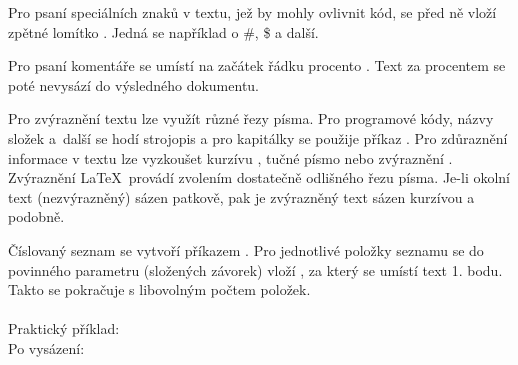 \documentclass[a4paper, 12pt]{report}
\begin{document}
	Pro psaní speciálních znaků v textu, jež by mohly ovlivnit kód, se před ně vloží zpětné lomítko \kurziva{$\backslash$}. Jedná se například o \#, \$ a další. 
	
	Pro psaní komentáře se umístí na začátek řádku procento \kurziva{\%}. Text za procentem se poté nevysází do výsledného dokumentu.
	
	Pro zvýraznění textu lze využít různé řezy písma. Pro programové kódy, názvy složek a~další se hodí strojopis  a pro kapitálky se použije příkaz . Pro zdůraznění informace v textu lze vyzkoušet kurzívu , tučné písmo  nebo zvýraznění . Zvýraznění \LaTeX ~provádí zvolením dostatečně odlišného řezu písma. Je-li okolní text (nezvýrazněný) sázen patkově, pak je zvýrazněný text sázen kurzívou a podobně.
	
	
	Číslovaný seznam se vytvoří příkazem . Pro jednotlivé položky seznamu se do povinného parametru (složených závorek) vloží , za který se umístí text 1. bodu. Takto se pokračuje s libovolným počtem položek. \\
	\\
	Praktický příklad:\\
	Po vysázení:
	
\end{document}
